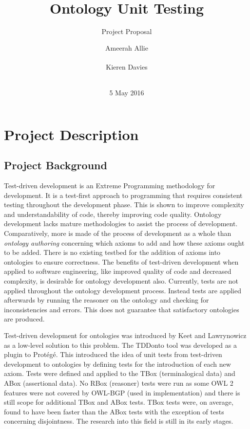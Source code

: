 \documentclass[draft]{sig-alternate}
\begin{document}
\title{Ontology Unit Testing}
\subtitle{Project Proposal}
\author{
  \alignauthor
  Ameerah Allie\\
    \\
  \alignauthor
  Kieren Davies\\
   \\
}
\date{5 May 2016}
\maketitle

\section{Project Description}

\subsection{Project Background}

Test-driven development is an Extreme Programming methodology for development. It is a test-first approach to programming that requires consistent testing throughout the development phase. This is shown to improve complexity and understandability of code, thereby improving code quality. Ontology development lacks mature methodologies to assist the process of development. Comparatively, more is made of the process of development as a whole than \textit{ontology authoring} concerning which axioms to add and how these axioms ought to be added. There is no existing testbed for the addition of axioms into ontologies to ensure correctness. The benefits of test-driven development when applied to software engineering, like improved quality of code and decreased complexity, is desirable for ontology development also. Currently, tests are not applied throughout the ontology development process. Instead tests are applied afterwards by running the reasoner on the ontology and checking for inconsistencies and errors. This does not guarantee that satisfactory ontologies are produced.

Test-driven development for ontologies was introduced by Keet and Lawrynowicz\cite{DBLP:journals/corr/KeetL15} as a low-level solution to this problem. The TDDonto tool was developed as a plugin to Protégé\cite{DBLP:conf/dlog/LawrynowiczK16}. This introduced the idea of unit tests from test-driven development to ontologies by defining tests for the introduction of each new axiom. Tests were defined and applied to the TBox (terminalogical data) and ABox (assertional data). No RBox (reasoner) tests were run as some OWL 2 features were not covered by OWL-BGP (used in implementation) and there is still scope for additional TBox and ABox tests. TBox tests were, on average, found to have been faster than the ABox tests with the exception of tests concerning disjointness. The research into this field is still in its early stages.
\end{document}
